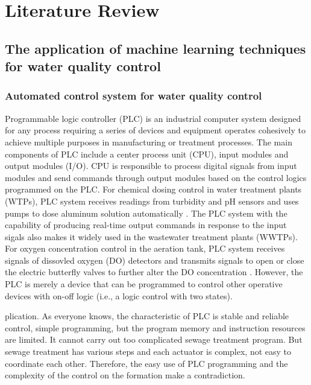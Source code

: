 \chapter{Literature Review}

\section{The application of machine learning techniques for water quality control}
\subsection{Automated control system for water quality control}
Programmable logic controller (PLC) is an industrial computer system designed for any process requiring a series of devices and equipment operates cohesively to achieve multiple purposes in manufacturing or treatment processes. The main components of PLC include a center process unit (CPU), input modules and output modules (I/O). CPU is responsible to process digital signals from input modules and send commands through output modules based on the control logics programmed on the PLC. For chemical dosing control in water treatment plants (WTPs), PLC system receives readings from turbidity and pH sensors and uses pumps to dose aluminum solution automatically \cite{andhareSCADAToolIncrease2014}. The PLC system with the capability of producing real-time output commands in response to the input sigals also makes it widely used in the wastewater treatment plants (WWTPs). For oxygen concentration control in the aeration tank, PLC system receives signals of dissovled oxygen (DO) detectors and transmits signals to open or close the electric butterfly valves to further alter the DO concentration \cite{zhuApplicationPLCSewage2017}. However, the PLC is merely a device that can be programmed to control other operative devices with on-off logic (i.e., a logic control with two states). 

plication. As everyone knows, the characteristic of PLC is stable and reliable control, simple programming, but the program memory and instruction resources are limited. It cannot carry out too complicated sewage treatment program. But sewage treatment has various steps and each actuator is complex, not easy to coordinate each other. Therefore, the easy use of PLC programming and the complexity of the control on the formation make a contradiction.

